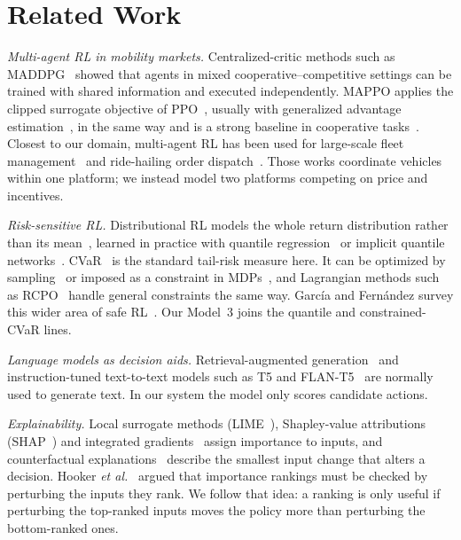 \documentclass[conference]{IEEEtran}
\begin{document}
\section{Related Work}
\emph{Multi-agent RL in mobility markets.} Centralized-critic methods such as MADDPG~\cite{lowe2017maddpg} showed that agents in mixed cooperative--competitive settings can be trained with shared information and executed independently. MAPPO applies the clipped surrogate objective of PPO~\cite{schulman2017ppo}, usually with generalized advantage estimation~\cite{schulman2016gae}, in the same way and is a strong baseline in cooperative tasks~\cite{yu2022mappo}. Closest to our domain, multi-agent RL has been used for large-scale fleet management~\cite{lin2018fleet} and ride-hailing order dispatch~\cite{li2019meanfield}. Those works coordinate vehicles within one platform; we instead model two platforms competing on price and incentives.

\emph{Risk-sensitive RL.} Distributional RL models the whole return distribution rather than its mean~\cite{bellemare2017distributional}, learned in practice with quantile regression~\cite{dabney2018qr} or implicit quantile networks~\cite{dabney2018iqn}. CVaR~\cite{rockafellar2000cvar} is the standard tail-risk measure here. It can be optimized by sampling~\cite{tamar2015cvar} or imposed as a constraint in MDPs~\cite{chow2014cvar}, and Lagrangian methods such as RCPO~\cite{tessler2019rcpo} handle general constraints the same way. Garc\'ia and Fern\'andez survey this wider area of safe RL~\cite{garcia2015safe}. Our Model~3 joins the quantile and constrained-CVaR lines.

\emph{Language models as decision aids.} Retrieval-augmented generation~\cite{lewis2020rag} and instruction-tuned text-to-text models such as T5 and FLAN-T5~\cite{raffel2020t5,chung2024flan} are normally used to generate text. In our system the model only scores candidate actions.

\emph{Explainability.} Local surrogate methods (LIME~\cite{ribeiro2016lime}), Shapley-value attributions (SHAP~\cite{lundberg2017shap}) and integrated gradients~\cite{sundararajan2017ig} assign importance to inputs, and counterfactual explanations~\cite{wachter2018counterfactual} describe the smallest input change that alters a decision. Hooker \emph{et al.}~\cite{hooker2019roar} argued that importance rankings must be checked by perturbing the inputs they rank. We follow that idea: a ranking is only useful if perturbing the top-ranked inputs moves the policy more than perturbing the bottom-ranked ones.
\end{document}
